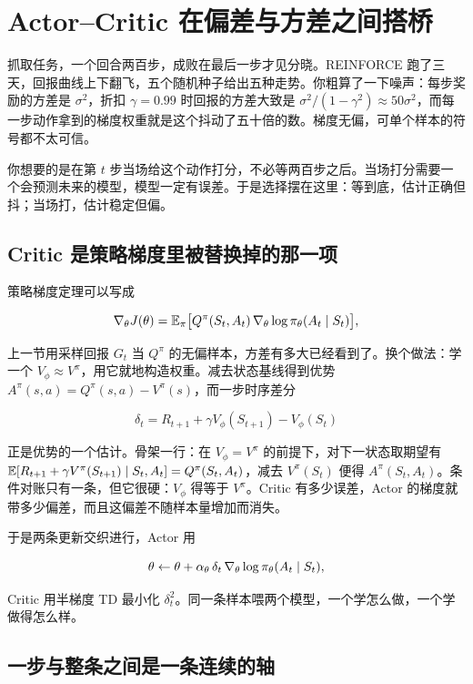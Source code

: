 \section{Actor--Critic 在偏差与方差之间搭桥}
\label{sec:16-Control-and-Reinforcement-Learning/02-Reinforcement-Learning/10}

抓取任务，一个回合两百步，成败在最后一步才见分晓。REINFORCE 跑了三天，回报曲线上下翻飞，五个随机种子给出五种走势。你粗算了一下噪声：每步奖励的方差是 \(\sigma^2\)，折扣 \(\gamma=0.99\) 时回报的方差大致是 \(\sigma^2/(1-\gamma^2)\approx50\sigma^2\)，而每一步动作拿到的梯度权重就是这个抖动了五十倍的数。梯度无偏，可单个样本的符号都不太可信。

你想要的是在第 \(t\) 步当场给这个动作打分，不必等两百步之后。当场打分需要一个会预测未来的模型，模型一定有误差。于是选择摆在这里：等到底，估计正确但抖；当场打，估计稳定但偏。

\subsection{Critic 是策略梯度里被替换掉的那一项}

策略梯度定理可以写成

\[
\nabla_\theta J(\theta)=\mathbb{E}_\pi\big[Q^\pi(S_t,A_t)\,\nabla_\theta\log\pi_\theta(A_t\mid S_t)\big],
\]

上一节用采样回报 \(G_t\) 当 \(Q^\pi\) 的无偏样本，方差有多大已经看到了。换个做法：学一个 \(V_\phi\approx V^\pi\)，用它就地构造权重。减去状态基线得到优势 \(A^\pi(s,a)=Q^\pi(s,a)-V^\pi(s)\)，而一步时序差分

\[
\delta_t=R_{t+1}+\gamma V_\phi(S_{t+1})-V_\phi(S_t)
\]

正是优势的一个估计。骨架一行：在 \(V_\phi=V^\pi\) 的前提下，对下一状态取期望有 \(\mathbb{E}[R_{t+1}+\gamma V^\pi(S_{t+1})\mid S_t,A_t]=Q^\pi(S_t,A_t)\)，减去 \(V^\pi(S_t)\) 便得 \(A^\pi(S_t,A_t)\)。条件对账只有一条，但它很硬：\(V_\phi\) 得等于 \(V^\pi\)。Critic 有多少误差，Actor 的梯度就带多少偏差，而且这偏差不随样本量增加而消失。

于是两条更新交织进行，Actor 用

\[
\theta\leftarrow\theta+\alpha_\theta\,\delta_t\,\nabla_\theta\log\pi_\theta(A_t\mid S_t),
\]

Critic 用半梯度 TD 最小化 \(\delta_t^2\)。同一条样本喂两个模型，一个学怎么做，一个学做得怎么样。

\subsection{一步与整条之间是一条连续的轴}

